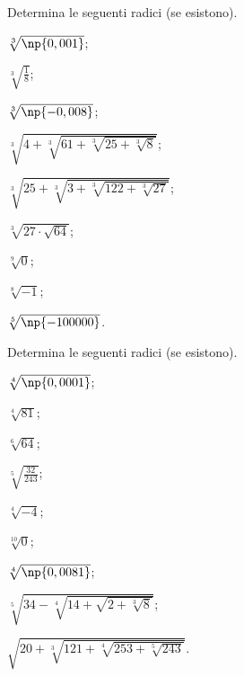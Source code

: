 \begin{esercizio}[\Ast]
 \label{ese:2.7}
Determina le seguenti radici (se esistono).
 \begin{multicols}{2}
 \begin{enumeratea}
 \item $\sqrt[3]{\np{0,001}}$;
 \item $\sqrt[3]{\frac 1 8}$;
 \item $\sqrt[3]{\np{-0,008}}$;
 \item $\sqrt[3]{4+\sqrt[3]{61+\sqrt[3]{25+\sqrt[3]8}}}$;
 \item $\sqrt[3]{25+\sqrt[3]{3+\sqrt[3]{122+\sqrt[3]{27}}}}$;
 \item $\sqrt[3]{27\cdot \sqrt{64}}$;
 \item $\sqrt[9]0$;
 \item $\sqrt[8]{-1}$;
 \item $\sqrt[5]{\np{-100000}}$.
 \end{enumeratea}
 \end{multicols}
\end{esercizio}

\begin{esercizio}[\Ast]
 \label{ese:2.8}
Determina le seguenti radici (se esistono).
 \begin{multicols}{2}
 \begin{enumeratea}
 \item $\sqrt[4]{\np{0,0001}}$;
 \item $\sqrt[4]{81}$;
 \item $\sqrt[6]{64}$;
 \item $\sqrt[5]{\frac{32}{243}}$;
 \item $\sqrt[4]{-4}$;
 \item $\sqrt[10]0$;
 \item $\sqrt[4]{\np{0,0081}}$;
 \item $\sqrt[5]{34-\sqrt[4]{14+\sqrt{2+\sqrt[3]8}}}$;
 \item $\sqrt{20+\sqrt[3]{121+\sqrt[4]{253+\sqrt[5]{243}}}}$.
 \end{enumeratea}
 \end{multicols}
\end{esercizio}

